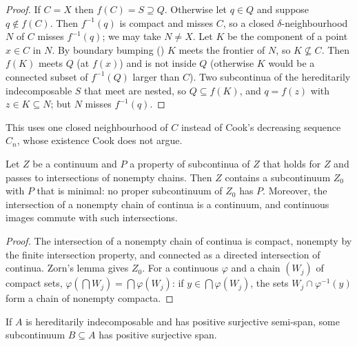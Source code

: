 \begin{proof}
If $C=X$ then $f(C)=S\supseteq Q$. Otherwise let $q\in Q$ and suppose $q\notin f(C)$. Then $f^{-1}(q)$ is compact and misses $C$, so a closed
$\delta$-neighbourhood $N$ of $C$ misses $f^{-1}(q)$; we may take $N\ne X$. Let $K$ be the component of a point $x\in C$ in $N$. By boundary
bumping () $K$ meets the frontier of $N$, so $K\not\subseteq C$. Then $f(K)$ meets $Q$ (at $f(x)$) and is not inside $Q$
(otherwise $K$ would be a connected subset of $f^{-1}(Q)$ larger than $C$). Two subcontinua of the hereditarily indecomposable $S$ that meet are
nested, so $Q\subseteq f(K)$, and $q=f(z)$ with $z\in K\subseteq N$; but $N$ misses $f^{-1}(q)$.
\end{proof}


This uses one closed neighbourhood of $C$ instead of Cook's decreasing sequence $C_n$, whose existence Cook does not argue.

\begin{lemma}\label{lem:brouwer}
Let $Z$ be a continuum and $P$ a property of subcontinua of $Z$ that holds for $Z$ and passes to intersections of nonempty chains. Then $Z$
contains a subcontinuum $Z_0$ with $P$ that is minimal: no proper subcontinuum of $Z_0$ has $P$. Moreover, the intersection of a nonempty chain
of continua is a continuum, and continuous images commute with such intersections.
\end{lemma}

\begin{proof}
The intersection of a nonempty chain of continua is compact, nonempty by the finite intersection property, and connected as a directed
intersection of continua. Zorn's lemma gives $Z_0$. For a continuous $\varphi$ and a chain $(W_j)$ of compact sets, $\varphi(\bigcap W_j)=\bigcap\varphi(W_j)$:
if $y\in\bigcap\varphi(W_j)$, the sets $W_j\cap\varphi^{-1}(y)$ form a chain of nonempty compacta.
\end{proof}


\begin{theorem}\label{thm:davis}
If $A$ is hereditarily indecomposable and has positive surjective semi-span, some subcontinuum $B\subseteq A$ has positive surjective span.
\end{theorem}

